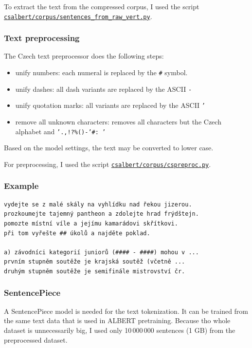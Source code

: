 \documentclass[
  printed, %
  color,   %
  table,   %
  oneside, %
  lof,     %
  lot,     %
]{fithesis3}
\begin{document}
To extract the text from the compressed corpus, I used the script \href{https://github.com/ZepZep/csalbert/blob/master/corpus/sentences_from_raw_vert.py}{\texttt{csalbert/corpus/sentences\_from\_raw\_vert.py}}.

\subsubsection{Text preprocessing}
\label{sec:text_preproc}
The Czech text preprocessor does the following steps:
\begin{itemize}
\itemsep-0.3em 
\item unify numbers: each numeral is replaced by the \texttt{\#} symbol.
\item unify dashes: all dash variants are replaced by the ASCII \texttt{-}
\item unify quotation marks: all variants are replaced by the ASCII \texttt{'}
\item remove all unknown characters: removes all characters but the Czech alphabet and \texttt{'.,!?\%()-'\#: '}
\end{itemize}

{\parindent=0cm
Based on the model settings, the text may be converted to lower case.

\vspace{1em}
For preprocessing, I used the script \href{https://github.com/ZepZep/csalbert/blob/master/corpus/cspreproc.py}{\texttt{csalbert/corpus/cspreproc.py}}.
}

\subsubsection{Example}
\begin{verbatim}
vydejte se z malé skály na vyhlídku nad řekou jizerou.
prozkoumejte tajemný pantheon a zdolejte hrad frýdštejn.
pomozte místní víle a jejímu kamarádovi skřítkovi.
při tom vyřešte ## úkolů a najděte poklad.

a) závodníci kategorií juniorů (#### - ####) mohou v ...
prvním stupněm soutěže je krajská soutěž (včetně ...
druhým stupněm soutěže je semifinále mistrovství čr.
\end{verbatim}

\subsubsection{SentencePiece}
A SentencePiece model is needed for the text tokenization. It can be trained from the same text data that is used in ALBERT pretraining. Because tho whole dataset is unnecessarily big, I used only 10\,000\,000 sentences (1 GB) from the preprocessed dataset.
\end{document}
